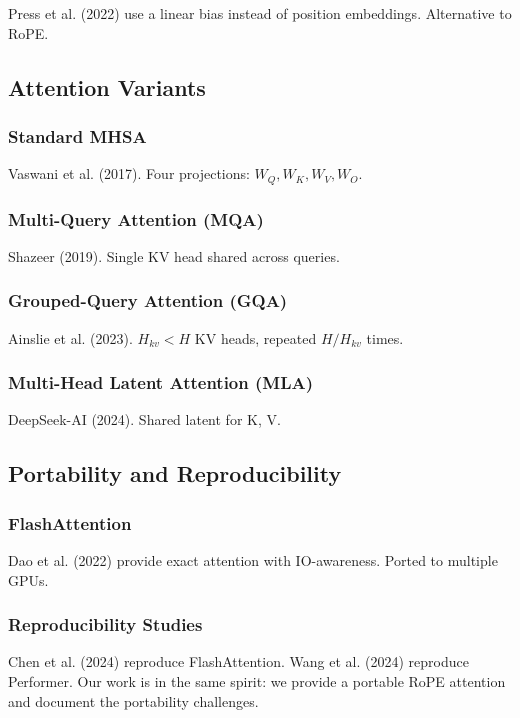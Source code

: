 Press et al. (2022) use a linear bias instead of position embeddings. 
Alternative to RoPE.

\subsection{Attention Variants}

\subsubsection{Standard MHSA}

Vaswani et al. (2017). Four projections: $W_Q, W_K, W_V, W_O$.

\subsubsection{Multi-Query Attention (MQA)}

Shazeer (2019). Single KV head shared across queries.

\subsubsection{Grouped-Query Attention (GQA)}

Ainslie et al. (2023). $H_{kv} < H$ KV heads, repeated $H / H_{kv}$ times.

\subsubsection{Multi-Head Latent Attention (MLA)}

DeepSeek-AI (2024). Shared latent for K, V.

\subsection{Portability and Reproducibility}

\subsubsection{FlashAttention}

Dao et al. (2022) provide exact attention with IO-awareness. Ported to 
multiple GPUs.

\subsubsection{Reproducibility Studies}

Chen et al. (2024) reproduce FlashAttention. Wang et al. (2024) reproduce 
Performer. Our work is in the same spirit: we provide a portable RoPE 
attention and document the portability challenges.

